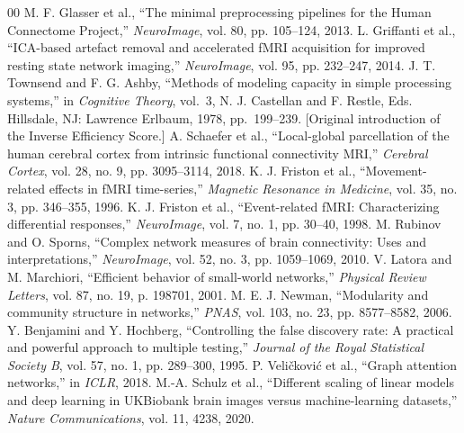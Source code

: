 \documentclass[conference]{IEEEtran}
\begin{document}
\begin{thebibliography}{00}
 M. F. Glasser et al., ``The minimal preprocessing pipelines for the Human Connectome Project,'' \textit{NeuroImage}, vol. 80, pp. 105--124, 2013.
 L. Griffanti et al., ``ICA-based artefact removal and accelerated fMRI acquisition for improved resting state network imaging,'' \textit{NeuroImage}, vol. 95, pp. 232--247, 2014.
 J. T. Townsend and F. G. Ashby, ``Methods of modeling capacity in simple processing systems,'' in \textit{Cognitive Theory}, vol.\ 3, N. J. Castellan and F. Restle, Eds. Hillsdale, NJ: Lawrence Erlbaum, 1978, pp.\ 199--239. [Original introduction of the Inverse Efficiency Score.]
 A. Schaefer et al., ``Local-global parcellation of the human cerebral cortex from intrinsic functional connectivity MRI,'' \textit{Cerebral Cortex}, vol. 28, no. 9, pp. 3095--3114, 2018.
 K. J. Friston et al., ``Movement-related effects in fMRI time-series,'' \textit{Magnetic Resonance in Medicine}, vol. 35, no. 3, pp. 346--355, 1996.
 K. J. Friston et al., ``Event-related fMRI: Characterizing differential responses,'' \textit{NeuroImage}, vol. 7, no. 1, pp. 30--40, 1998.
 M. Rubinov and O. Sporns, ``Complex network measures of brain connectivity: Uses and interpretations,'' \textit{NeuroImage}, vol. 52, no. 3, pp. 1059--1069, 2010.
 V. Latora and M. Marchiori, ``Efficient behavior of small-world networks,'' \textit{Physical Review Letters}, vol. 87, no. 19, p. 198701, 2001.
 M. E. J. Newman, ``Modularity and community structure in networks,'' \textit{PNAS}, vol. 103, no. 23, pp. 8577--8582, 2006.
 Y. Benjamini and Y. Hochberg, ``Controlling the false discovery rate: A practical and powerful approach to multiple testing,'' \textit{Journal of the Royal Statistical Society B}, vol. 57, no. 1, pp. 289--300, 1995.
 P. Veli\v{c}kovi\'c et al., ``Graph attention networks,'' in \textit{ICLR}, 2018.
 M.-A. Schulz et al., ``Different scaling of linear models and deep learning in UKBiobank brain images versus machine-learning datasets,'' \textit{Nature Communications}, vol. 11, 4238, 2020.
\end{thebibliography}
\end{document}
